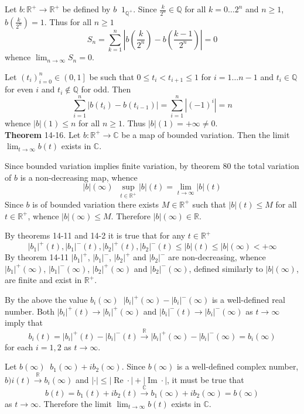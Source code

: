\documentclass[a4paper]{article}
\newcommand{\ploc}[1]{\left ( #1 \right ]}
\newcommand{\brac}[1]{\left ( #1 \right )}
\newcommand{\abs}[1]{\left | #1 \right |}
\newcommand{\Real}{\mathbb{R}}
\newcommand{\Cplx}{\mathbb{C}}
\newcommand{\defn}{\mathop{\overset{\Delta}{=}}\nolimits}
\newcommand{\re}{\operatorname{Re}\nolimits}
\newcommand{\im}{\operatorname{Im}\nolimits}
\begin{document}
Let $b:\Real^+\to \Real^+$ be defined by $b\defn 1_{\mathbb{Q}^+}$. Since $\frac{k}{2^n}\in\mathbb{Q}$ for all $k=0\ldots 2^n$ and $n\geq1$, $b\brac{\frac{k}{2^n}}=1$. Thus for all $n\geq1$ \[S_n=\sum_{k=1}^n \abs{b\brac{\frac{k}{2^n}}-b\brac{\frac{k-1}{2^n}}}=0\] whence $\lim_{n\to \infty} S_n = 0$.

Let $\brac{t_i}_{i=0}^n\in\ploc{0,1}$ be such that $0\leq t_i<t_{i+1}\leq 1$ for $i=1\ldots {n-1}$ and $t_i\in \mathbb{Q}$ for even $i$ and $t_i\notin \mathbb{Q}$ for odd. Then \[\sum_{i=1}^n \abs{b\brac{t_i}-b\brac{t_{i-1}}} = \sum_{i=1}^n \abs{\brac{-1}^i} = n\] whence $\abs{b}\brac{1}\leq n$ for all $n\geq1$. Thus $\abs{b}\brac{1}=+\infty\neq 0$.\\

\label{thm:bound_var_cplx_limit}\noindent\textbf{Theorem} 14-16.
Let $b:\Real^+\to \Cplx$ be a map of bounded variation. Then the limit $\lim_{t\to\infty} b\brac{t}$ exists in $\Cplx$.

Since bounded variation implies finite variation, by theorem 80 the total variation of $b$ is a non-decreasing map, whence \[\abs{b}\brac{\infty}\defn \sup_{t\in \Real^+}\abs{b}\brac{t}=\lim_{t\to\infty}\abs{b}\brac{t}\] Since $b$ is of bounded variation there exists $M\in\Real^+$ such that $\abs{b}\brac{t}\leq M$ for all $t\in \Real^+$, whence $\abs{b}\brac{\infty}\leq M$. Therefore $\abs{b}\brac{\infty}\in \Real$.

By theorems 14-11 and 14-2 it is true that for any $t\in \Real^+$ \[\abs{b_1}^+\brac{t}, \abs{b_1}^-\brac{t}, \abs{b_2}^+\brac{t}, \abs{b_2}^-\brac{t}\leq \abs{b}\brac{t}\leq \abs{b}\brac{\infty}<+\infty\] By theorem 14-11 $\abs{b_1}^+$, $\abs{b_1}^-$, $\abs{b_2}^+$ and $\abs{b_2}^-$ are non-decreasing, whence $\abs{b_1}^+\brac{\infty}$, $\abs{b_1}^-\brac{\infty}$, $\abs{b_2}^+\brac{\infty}$ and $\abs{b_2}^-\brac{\infty}$, defined similarly to $\abs{b}\brac{\infty}$, are finite and exist in $\Real^+$.

By the above the value $b_i\brac{\infty}\defn \abs{b_i}^+\brac{\infty} - \abs{b_i}^-\brac{\infty}$ is a well-defined real number. Both $\abs{b_i}^+\brac{t}\to\abs{b_i}^+\brac{\infty}$ and $\abs{b_i}^-\brac{t}\to\abs{b_i}^-\brac{\infty}$ as $t\to \infty$ imply that \[b_i\brac{t} = \abs{b_i}^+\brac{t} - \abs{b_i}^-\brac{t} \overset{\Real}{\to} \abs{b_i}^+\brac{\infty} - \abs{b_i}^-\brac{\infty} = b_i\brac{\infty}\] for each $i=1,2$ as $t\to \infty$.

Let $b\brac{\infty}\defn b_1\brac{\infty} + i b_2\brac{\infty}$. Since $b\brac{\infty}$ is a well-defined complex number,  $b)i\brac{t}\overset{\Real}{\to} b_i\brac{\infty}$ and $\abs{\cdot}\leq \abs{\re \cdot}+\abs{\im \cdot}$, it must be true that \[b\brac{t} = b_1\brac{t}+i b_2\brac{t}\overset{\Cplx}{\to} b_1\brac{\infty}+i b_2\brac{\infty} = b\brac{\infty}\] as $t\to \infty$. Therefore the limit $\lim_{t\to\infty}b\brac{t}$ exists in $\Cplx$.\\
\end{document}
